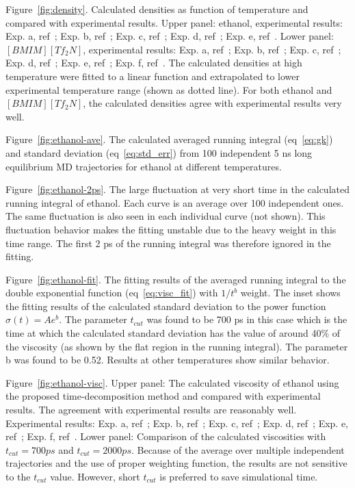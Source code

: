 \documentclass[12pt]{article}
\begin{document}
Figure~\ref{fig:density}.
Calculated densities as function of temperature and compared with experimental results.
Upper panel: ethanol, 
experimental results: 
Exp. a, ref~\cite{Jouyban.KJCE.29.812.2012};
Exp. b, ref~\cite{Bhuiyan.JML.138.139.2008};
Exp. c, ref~\cite{Fonseca.JCED.52.1240.2007};
Exp. d, ref~\cite{Taboas.JCED.51.940.2006};
Exp. e, ref~\cite{Tojo.JCED.49.1590.2004}.
Lower panel: $[BMIM][Tf_2N]$,
experimental results: 
Exp. a, ref~\cite{Gadzuric.JCED.57.1072.2012};
Exp. b, ref~\cite{Katsuta.JCED.55.1588.2010};
Exp. c, ref~\cite{Watanabe.JPCB.110.19593.2006};
Exp. d, ref~\cite{Majer.GC.8.172.2006};
Exp. e, ref~\cite{Heintz.JCED.53.596.2008};
Exp. f, ref~\cite{Husson.JCED.52.2204.2007}.
The calculated densities at high temperature were fitted to a linear function and extrapolated to lower experimental temperature range
(shown as dotted line).
For both ethanol and $[BMIM][Tf_2N]$,
the calculated densities agree with experimental results very well.


Figure~\ref{fig:ethanol-ave}.
The calculated averaged running integral (eq~\ref{eq:gk})
and standard deviation (eq~\ref{eq:std_err}) 
from 100 independent 5 ns long equilibrium MD trajectories for ethanol at different temperatures.


Figure~\ref{fig:ethanol-2ps}.
The large fluctuation at very short time in the calculated running integral of ethanol.
Each curve is an average over 100 independent ones.
The same fluctuation is also seen in each individual curve (not shown).
This fluctuation behavior makes the fitting unstable due to the heavy weight in this time range.
The first 2 ps of the running integral was therefore ignored in the fitting.

Figure~\ref{fig:ethanol-fit}.
The fitting results of the averaged running integral to the double exponential function (eq~\ref{eq:visc_fit}) with $1/t^b$ weight.
The inset shows the fitting results of the calculated standard deviation to the power function $\sigma(t) = Ae^b$.
The parameter $t_{cut}$ was found to be 700 ps in this case
which is the time at which the calculated standard deviation has the value of around 40\% of the viscosity 
(as shown by the flat region in the running integral).
The parameter b was found to be 0.52.
Results at other temperatures show similar behavior.

Figure~\ref{fig:ethanol-visc}.
Upper panel: The calculated viscosity of ethanol using the proposed time-decomposition method
and compared with experimental results.
The agreement with experimental results are reasonably well.
Experimental results: 
Exp. a, ref~\cite{Jouyban.KJCE.29.812.2012};
Exp. b, ref~\cite{Nain.JML.140.108.2008};
Exp. c, ref~\cite{Bhuiyan.JML.138.139.2008};
Exp. d, ref~\cite{Fonseca.JCED.52.1240.2007};
Exp. e, ref~\cite{Taboas.JCED.51.940.2006};
Exp. f, ref~\cite{Tojo.JCED.49.1590.2004}.
Lower panel: Comparison of the calculated viscosities with $t_{cut}=700 ps$ and $t_{cut}=2000 ps$.
Because of the average over multiple independent trajectories and the use of proper weighting function,
the results are not sensitive to the $t_{cut}$ value.
However, short $t_{cut}$ is preferred to save simulational time. 
\end{document}
